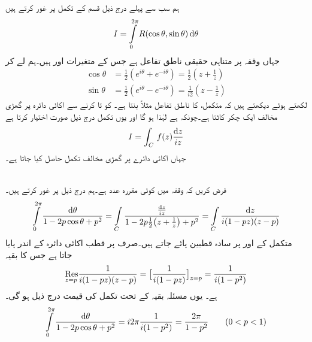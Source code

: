 ہم سب سے پہلے درج ذیل قسم کے تکمل پر غور کرتے ہیں
\begin{align}\label{مساوات_بقیہ_حقیقی_تکمل_الف}
I=\int\limits_{0}^{2\pi} R(\cos \theta,\sin\theta)\dif \theta
\end{align}
جہاں  وقفہ  پر متناہی حقیقی ناطق تفاعل  ہے جس کے متغیرات  اور  ہیں۔ہم  لے کر
\begin{align*}
\cos\theta&=\frac{1}{2}(e^{i\theta}+e^{-i\theta})=\frac{1}{2}(z+\frac{1}{z})\\
\sin\theta&=\frac{1}{2}(e^{i\theta}-e^{-i\theta})=\frac{1}{i2}(z-\frac{1}{z})
\end{align*}
لکھتے ہوئے دیکھتے ہیں کہ متکمل،  کا ناطق تفاعل مثلاً  بنتا ہے۔ کو   تا  کرنے سے  اکائی دائرہ  پر گھڑی مخالف ایک چکر کاٹتا ہے۔چونکہ  ہے لہٰذا  ہو گا اور یوں تکمل درج ذیل صورت اختیار کرتا ہے
\begin{align}\label{مساوات_بقیہ_حقیقی_تکمل_ب}
I=\int_C\,f(z)\frac{\dif z}{iz}
\end{align}
جہاں اکائی دائرے پر گھڑی مخالف تکمل حاصل کیا جاتا ہے۔

\quad {}\\
فرض کریں کہ  وقفہ  میں کوئی مقررہ عدد ہے۔ہم درج ذیل پر غور کرتے ہیں۔
\begin{align*}
\int\limits_0^{2\pi}\frac{\dif \theta}{1-2p\cos\theta+p^2}=\int\limits_C\frac{\frac{\dif z}{iz}}{1-2p\frac{1}{2}\big(z+\frac{1}{z}\big)+p^2}=\int\limits_C \frac{\dif z}{i(1-pz)(z-p)}
\end{align*}
متکمل کے  اور  پر سادہ قطبین پائے جاتے ہیں۔صرف  پر قطب اکائی دائرہ  کے اندر پایا جاتا ہے جس کا بقیہ
\begin{align*}
\underset{z=p\hfill}{\Res} \frac{1}{i(1-pz)(z-p)}=\big[\frac{1}{i(1-pz)}\big]_{z=p}=\frac{1}{i(1-p^2)}
\end{align*}
ہے۔ یوں مسئلہ بقیہ کے تحت تکمل کی قیمت درج ذیل ہو گی۔
\begin{align*}
\int\limits_0^{2\pi}\frac{\dif \theta}{1-2p\cos\theta+p^2}=i2\pi\frac{1}{i(1-p^2)}=\frac{2\pi}{1-p^2}\quad \quad (0<p<1)
\end{align*}

